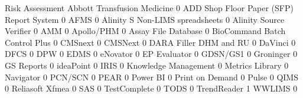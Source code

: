 \documentclass{article}
\begin{document}
\begin{Schunk}
\begin{Soutput}
                                           Risk Assessment
  Abbott Transfusion Medicine                            0
  ADD Shop Floor Paper (SFP) Report System               0
  AFMS                                                   0
  Alinity S Non-LIMS spreadsheets                        0
  Alinity Source Verifier                                0
  AMM                                                    0
  Apollo/PHM                                             0
  Assay File Database                                    0
  BioCommand Batch Control Plus                          0
  CMSnext                                                0
  CMSNext                                                0
  DARA Filler DHM and RU                                 0
  DaVinci                                                0
  DFCS                                                   0
  DPW                                                    0
  EDMS                                                   0
  eNovator                                               0
  EP Evaluator                                           0
  GDSN/GS1                                               0
  Groninger                                              0
  GS Reports                                             0
  ideaPoint                                              0
  IRIS                                                   0
  Knowledge Management                                   0
  Metrics Library                                        0
  Navigator                                              0
  PCN/SCN                                                0
  PEAR                                                   0
  Power BI                                               0
  Print on Demand                                        0
  Pulse                                                  0
  QIMS                                                   0
  Reliasoft Xfmea                                        0
  SAS                                                    0
  TestComplete                                           0
  TODS                                                   0
  TrendReader                                            1
  WWLIMS                                                 0


\end{Soutput}
\end{Schunk}
\end{document}

